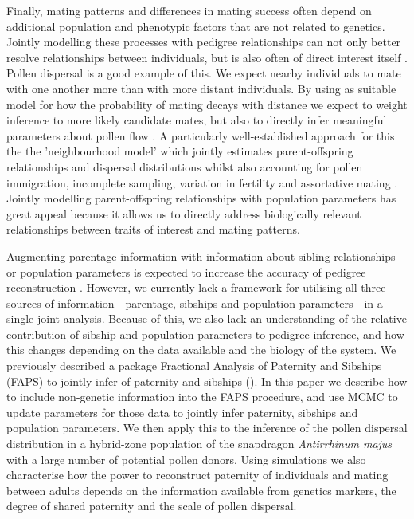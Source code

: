 \documentclass[10pt, a4paper, twocolumn]{article} %
\begin{document}
Finally, mating patterns and differences in mating success often depend on additional population and phenotypic factors that are not related to genetics.
Jointly modelling these processes with pedigree relationships can not only better resolve relationships between individuals, but is also often of direct interest itself \citep{neff2001bayesian, hadfield2006towards}.
Pollen dispersal is a good example of this.
We expect nearby individuals to mate with one another more than with more distant individuals.
By using as suitable model for how the probability of mating decays with distance we expect to weight inference to more likely candidate mates, but also to directly infer meaningful parameters about pollen flow \citep{adams1992using, jones2003maximum, oddou2005pollen, klein2008pollen, chybicki2013seeing}.
A particularly well-established approach for this the the 'neighbourhood model' which jointly estimates parent-offspring relationships and dispersal distributions whilst also accounting for pollen immigration, incomplete sampling, variation in fertility and assortative mating \citep{adams1989mating, burczyk2004cautions, oddou2005pollen, chybicki2013seeing, gerard2006assortative, chybicki2018nmpi, chybicki2021identification}.
Jointly modelling parent-offspring relationships with population parameters has great appeal because it allows us to directly address biologically relevant relationships between traits of interest and mating patterns.

Augmenting parentage information with information about sibling relationships or population parameters is expected to increase the accuracy of pedigree reconstruction \citep{neff2001bayesian, wang2007parentage}.
However, we currently lack a framework for utilising all three sources of information - parentage, sibships and population parameters - in a single joint analysis.
Because of this, we also lack an understanding of the relative contribution of sibship and population parameters to pedigree inference, and how this changes depending on the data available and the biology of the system.
We previously described a package Fractional Analysis of Paternity and Sibships (FAPS) to jointly infer of paternity and sibships (\cite{ellis2018efficient}).
In this paper we describe how to include non-genetic information into the FAPS procedure, and use MCMC to update parameters for those data to jointly infer paternity, sibships and population parameters.
We then apply this to the inference of the pollen dispersal distribution in a hybrid-zone population of the snapdragon \textit{Antirrhinum majus} with a large number of potential pollen donors.
Using simulations we also characterise how the power to reconstruct paternity of individuals and mating between adults depends on the information available from genetics markers, the degree of shared paternity and the scale of pollen dispersal.
\end{document}
